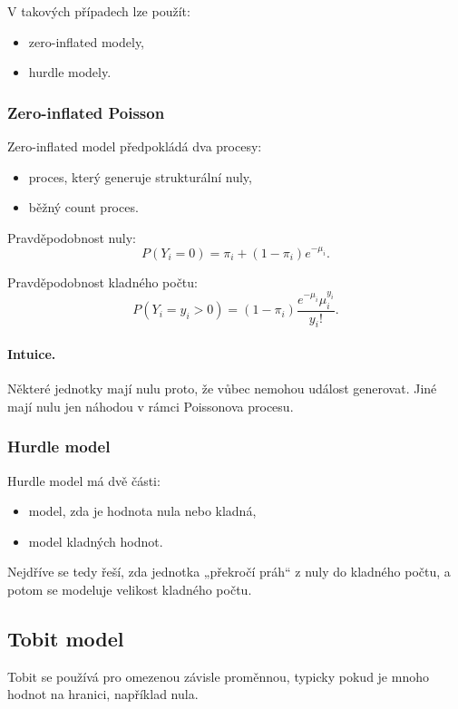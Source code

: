 V takových případech lze použít:
\begin{itemize}
    \item zero-inflated modely,
    \item hurdle modely.
\end{itemize}

\subsubsection{Zero-inflated Poisson}

Zero-inflated model předpokládá dva procesy:
\begin{itemize}
    \item proces, který generuje strukturální nuly,
    \item běžný count proces.
\end{itemize}

Pravděpodobnost nuly:
\[
P(Y_i=0)
=
\pi_i+(1-\pi_i)e^{-\mu_i}.
\]

Pravděpodobnost kladného počtu:
\[
P(Y_i=y_i>0)
=
(1-\pi_i)
\frac{e^{-\mu_i}\mu_i^{y_i}}{y_i!}.
\]

\paragraph{Intuice.}
Některé jednotky mají nulu proto, že vůbec nemohou událost generovat. Jiné mají nulu jen náhodou v rámci
Poissonova procesu.

\subsubsection{Hurdle model}

Hurdle model má dvě části:
\begin{itemize}
    \item model, zda je hodnota nula nebo kladná,
    \item model kladných hodnot.
\end{itemize}

Nejdříve se tedy řeší, zda jednotka „překročí práh“ z nuly do kladného počtu, a potom se modeluje velikost
kladného počtu.

\subsection{Tobit model}

Tobit se používá pro omezenou závisle proměnnou, typicky pokud je mnoho hodnot na hranici, například nula.

